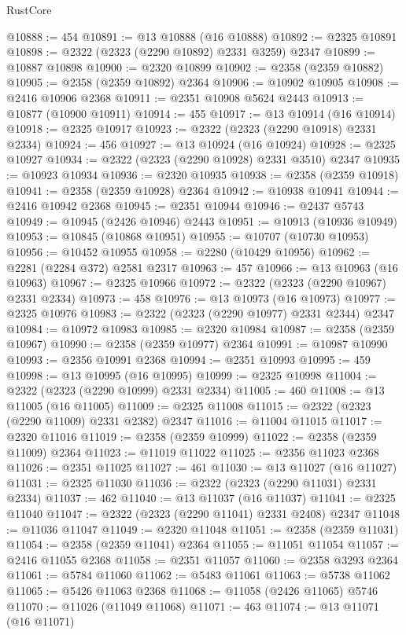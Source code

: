 \begin{lexlean}{RustCore}
\begin{coremodule}
@10888 := 454
@10891 := @13 @10888 (@16 @10888)
@10892 := @2325 @10891
@10898 := @2322 (@2323 (@2290 @10892) @2331 @3259) @2347
@10899 := @10887 @10898
@10900 := @2320 @10899
@10902 := @2358 (@2359 @10882)
@10905 := @2358 (@2359 @10892) @2364
@10906 := @10902 @10905
@10908 := @2416 @10906 @2368
@10911 := @2351 @10908 @5624 @2443
@10913 := @10877 (@10900 @10911)
@10914 := 455
@10917 := @13 @10914 (@16 @10914)
@10918 := @2325 @10917
@10923 := @2322 (@2323 (@2290 @10918) @2331 @2334)
@10924 := 456
@10927 := @13 @10924 (@16 @10924)
@10928 := @2325 @10927
@10934 := @2322 (@2323 (@2290 @10928) @2331 @3510) @2347
@10935 := @10923 @10934
@10936 := @2320 @10935
@10938 := @2358 (@2359 @10918)
@10941 := @2358 (@2359 @10928) @2364
@10942 := @10938 @10941
@10944 := @2416 @10942 @2368
@10945 := @2351 @10944
@10946 := @2437 @5743
@10949 := @10945 (@2426 @10946) @2443
@10951 := @10913 (@10936 @10949)
@10953 := @10845 (@10868 @10951)
@10955 := @10707 (@10730 @10953)
@10956 := @10452 @10955
@10958 := @2280 (@10429 @10956)
@10962 := @2281 (@2284 @372) @2581 @2317
@10963 := 457
@10966 := @13 @10963 (@16 @10963)
@10967 := @2325 @10966
@10972 := @2322 (@2323 (@2290 @10967) @2331 @2334)
@10973 := 458
@10976 := @13 @10973 (@16 @10973)
@10977 := @2325 @10976
@10983 := @2322 (@2323 (@2290 @10977) @2331 @2344) @2347
@10984 := @10972 @10983
@10985 := @2320 @10984
@10987 := @2358 (@2359 @10967)
@10990 := @2358 (@2359 @10977) @2364
@10991 := @10987 @10990
@10993 := @2356 @10991 @2368
@10994 := @2351 @10993
@10995 := 459
@10998 := @13 @10995 (@16 @10995)
@10999 := @2325 @10998
@11004 := @2322 (@2323 (@2290 @10999) @2331 @2334)
@11005 := 460
@11008 := @13 @11005 (@16 @11005)
@11009 := @2325 @11008
@11015 := @2322 (@2323 (@2290 @11009) @2331 @2382) @2347
@11016 := @11004 @11015
@11017 := @2320 @11016
@11019 := @2358 (@2359 @10999)
@11022 := @2358 (@2359 @11009) @2364
@11023 := @11019 @11022
@11025 := @2356 @11023 @2368
@11026 := @2351 @11025
@11027 := 461
@11030 := @13 @11027 (@16 @11027)
@11031 := @2325 @11030
@11036 := @2322 (@2323 (@2290 @11031) @2331 @2334)
@11037 := 462
@11040 := @13 @11037 (@16 @11037)
@11041 := @2325 @11040
@11047 := @2322 (@2323 (@2290 @11041) @2331 @2408) @2347
@11048 := @11036 @11047
@11049 := @2320 @11048
@11051 := @2358 (@2359 @11031)
@11054 := @2358 (@2359 @11041) @2364
@11055 := @11051 @11054
@11057 := @2416 @11055 @2368
@11058 := @2351 @11057
@11060 := @2358 @3293 @2364
@11061 := @5784 @11060
@11062 := @5483 @11061
@11063 := @5738 @11062
@11065 := @5426 @11063 @2368
@11068 := @11058 (@2426 @11065) @5746
@11070 := @11026 (@11049 @11068)
@11071 := 463
@11074 := @13 @11071 (@16 @11071)

\end{coremodule}
\end{lexlean}
